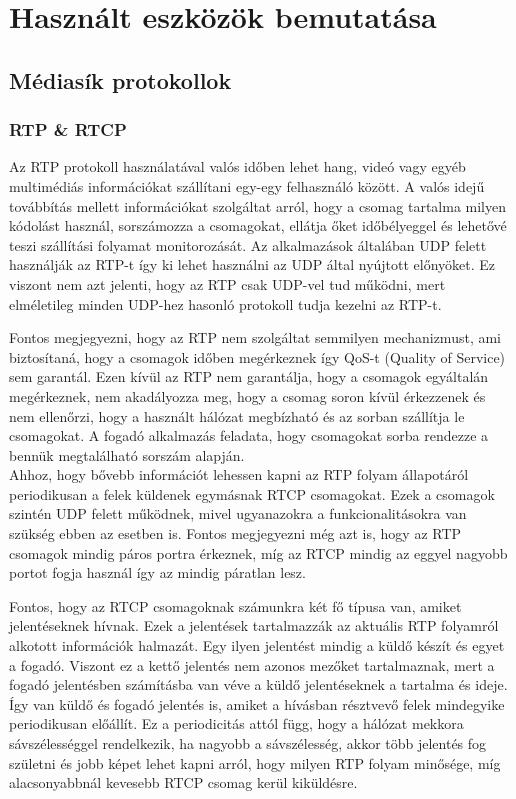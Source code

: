 \chapter{Használt eszközök bemutatása}

\section{Médiasík protokollok}

\subsection{RTP \& RTCP}

Az RTP protokoll használatával valós időben lehet hang, videó vagy egyéb multimédiás 
információkat szállítani egy-egy felhasználó között. A valós idejű továbbítás mellett
információkat szolgáltat arról, hogy a csomag tartalma milyen kódolást használ, 
sorszámozza a csomagokat, ellátja őket időbélyeggel és lehetővé teszi szállítási folyamat
monitorozását. Az alkalmazások általában UDP felett használják az RTP-t így ki lehet
használni az UDP által nyújtott előnyöket. Ez viszont nem azt jelenti, hogy az RTP
csak UDP-vel tud működni, mert elméletileg minden UDP-hez hasonló protokoll tudja kezelni
az RTP-t.

Fontos megjegyezni, hogy az RTP nem szolgáltat semmilyen mechanizmust, ami biztosítaná,
hogy a csomagok időben megérkeznek így QoS-t (Quality of Service) sem garantál. Ezen kívül
az RTP nem garantálja, hogy a csomagok egyáltalán megérkeznek, nem akadályozza meg, hogy a 
csomag soron kívül érkezzenek és nem ellenőrzi, hogy a használt hálózat megbízható és az
sorban szállítja le csomagokat. A fogadó alkalmazás feladata, hogy csomagokat sorba rendezze
a bennük megtalálható sorszám alapján. \\

Ahhoz, hogy bővebb információt lehessen kapni az RTP folyam állapotáról periodikusan a 
felek küldenek egymásnak RTCP csomagokat. Ezek a csomagok szintén UDP felett működnek,
mivel ugyanazokra a funkcionalitásokra van szükség ebben az esetben is. Fontos megjegyezni
még azt is, hogy az RTP csomagok mindig páros portra érkeznek, míg az RTCP mindig az eggyel
nagyobb portot fogja használ így az mindig páratlan lesz.

Fontos, hogy az RTCP csomagoknak számunkra két fő típusa van, amiket jelentéseknek hívnak.
Ezek a jelentések tartalmazzák az aktuális RTP folyamról alkotott információk halmazát. Egy
ilyen jelentést mindig a küldő készít és egyet a fogadó. Viszont ez a kettő jelentés nem azonos
mezőket tartalmaznak, mert a fogadó jelentésben számításba van véve a küldő jelentéseknek 
a tartalma és ideje. Így van küldő és fogadó jelentés is, amiket a hívásban résztvevő felek 
mindegyike periodikusan előállít. Ez a periodicitás attól függ, hogy a hálózat mekkora 
sávszélességgel rendelkezik, ha nagyobb a sávszélesség, akkor több jelentés fog születni és
jobb képet lehet kapni arról, hogy milyen RTP folyam minősége, míg alacsonyabbnál kevesebb
RTCP csomag kerül kiküldésre. 

